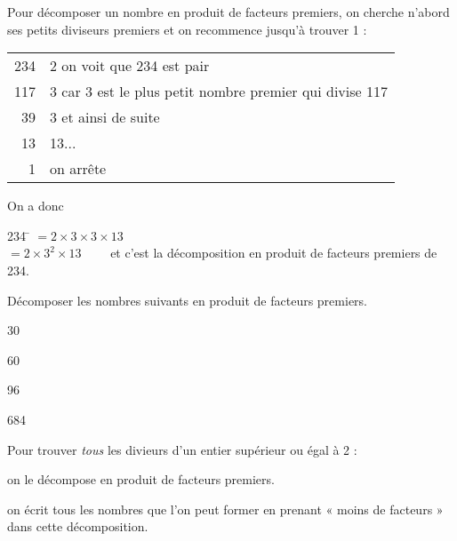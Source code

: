 \begin{methode}[]
	Pour décomposer un nombre en produit de facteurs premiers, on cherche n'abord ses petits diviseurs premiers et on recommence jusqu'à trouver 1 :
	\begin{center}
		\tabdefault
		\begin{tabular}{r|l}
			234 & 2 \hspace*{3ex}on voit que 234 est pair                              \\
			117 & 3 \hspace*{3ex}car 3 est le plus petit nombre premier qui divise 117 \\
			39  & 3 \hspace*{3ex}et ainsi de suite                                     \\
			13  & 13\hspace*{3ex}...                                                   \\
			1   & \hspace*{4.55ex}on arrête
		\end{tabular}
	\end{center}
	On a donc
	\begin{tabbing}
		234 \= $=2\times 3\times 3\times 13$\\
		\> $=2\times 3^2\times 13\qquad$ et c'est la décomposition en produit de facteurs premiers de 234.
	\end{tabbing}
\end{methode}



\begin{exercice}[]
	
	Décomposer les nombres suivants en produit de facteurs premiers.
	
	\begin{multicols}{2}
		\begin{enumalph}
			\item 30
			\item 60
			\item 96
			\item 684
		\end{enumalph}
	\end{multicols}
\end{exercice}


\begin{methode}
	Pour trouver \textit{tous} les divieurs d'un entier supérieur ou égal à 2 :
	\begin{enumalph}
		\item 	on le décompose en produit de facteurs premiers.
		\item 	on écrit tous les nombres que l'on peut former en prenant  «  moins de facteurs »  dans cette décomposition.
	\end{enumalph}
\end{methode}

